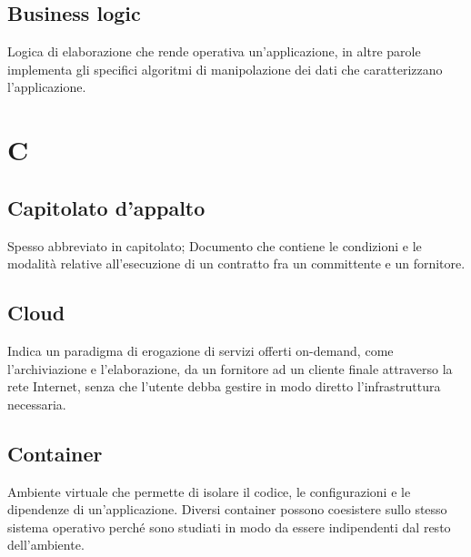 \subsection*{Business logic}
Logica di elaborazione che rende operativa un'applicazione, in altre parole implementa gli specifici algoritmi di manipolazione dei dati che caratterizzano l’applicazione.
\clearpage
\section*{C}

\subsection*{Capitolato d'appalto}
Spesso abbreviato in capitolato; Documento che contiene le condizioni e le modalità relative all'esecuzione di un contratto fra un committente e un fornitore.


\subsection*{Cloud}
Indica un paradigma di erogazione di servizi offerti on-demand, come l'archiviazione e l'elaborazione, da un fornitore ad un cliente finale attraverso la rete Internet, senza che l'utente debba gestire in modo diretto l'infrastruttura necessaria.

\subsection*{Container}
Ambiente virtuale che permette di isolare il codice, le configurazioni e le dipendenze di un'applicazione. Diversi container possono coesistere sullo stesso sistema operativo perché sono studiati in modo da essere indipendenti dal resto dell'ambiente.


